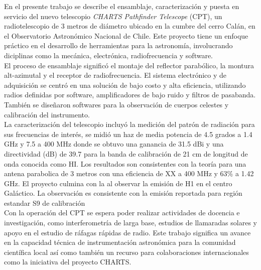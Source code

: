 \documentclass[
	spanish, %
	letterpaper, oneside
]{book}
\begin{document}
\templatePortrait

\templatePagecfg

\begin{abstractd}
	En el presente trabajo se describe el ensamblaje, caracterización y puesta en servicio del nuevo telescopio \textit{CHARTS Pathfinder Telescope} (CPT), un radiotelescopio de 3 metros de diámetro ubicado en la cumbre del cerro Calán, en el Observatorio Astronómico Nacional de Chile. Este proyecto tiene un enfoque práctico en el desarrollo de herramientas para la astronomía, involucrando diciplinas como la mecánica, electrónica, radiofrecuencia y software.\\
	
	El proceso de ensamblaje significó el montaje del reflector parabólico, la montura alt-azimutal y el receptor de radiofrecuencia. El sistema electrónico y de adquisición se centró en una solución de bajo costo y alta eficiencia, utilizando radios definidas por software, amplificadores de bajo ruido y filtros de pasabanda. También se diseñaron softwares para la observación de cuerpos celestes y calibración del instrumento.\\

	La caracterización del telescopio incluyó la medición del patrón de radiación para sus frecuencias de interés, se midió un haz de media potencia de 4.5 grados a 1.4 GHz y 7.5 a 400 MHz donde se obtuvo una ganancia de 31.5 dBi y una directividad (dB) de 39.7 para la banda de calibración de 21 cm de longitud de onda conocida como HI. Los resultados son consistentes con la teoría para una antena parabolica de 3 metros con una eficiencia de XX a 400 MHz y 63\% a 1.42 GHz. El proyecto culmina con la  al observar la emisión de H1 en el centro Galáctico. La observación es consistente con la emisión reportada para región estandar S9 de calibración\\

	Con la operación del CPT se espera poder realizar actividades de docencia e investigación, como interferometría de larga base, estudios de llamaradas solares y apoyo  en el estudio de ráfagas rápidas de radio. Este trabajo significa un avance en la capacidad técnica de instrumentación astronómica para la comunidad científica local así como también un recurso para colaboraciones internacionales como la iniciativa del proyecto CHARTS. \\
\end{abstractd}
\end{document}
